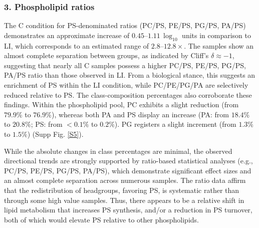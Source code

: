 \documentclass[10pt,letterpaper]{article}
\begin{document}
\begin{itemize}
\subsubsection*{3. Phospholipid ratios}
The C condition for PS-denominated ratios (PC/PS, PE/PS, PG/PS, PA/PS) demonstrates an approximate increase of $0.45$–$1.11 \,\log_{10}$ units in comparison to LI, which corresponds to an estimated range of $2.8$–$12.8\times$. The samples show an almost complete separation between groups, as indicated by Cliff’s $\delta \approx -1$, suggesting that nearly all C samples possess a higher PC/PS, PE/PS, PG/PS, PA/PS ratio than those observed in LI. From a biological stance, this suggests an enrichment of PS within the LI condition, 
while PC/PE/PG/PA are selectively reduced relative to PS. The class-composition percentages also corroborate these findings. Within the phospholipid pool, PC exhibits a slight reduction (from $79.9\%$ to $76.9\%$), whereas both PA and PS display an increase (PA: from $18.4\%$ to $20.8\%$; PS: from $<0.1\%$ to $0.2\%$). PG registers a slight increment (from $1.3\%$ to $1.5\%$) (Supp Fig. \ref{S5}). 

While the absolute changes in class percentages are minimal, the observed directional trends are strongly supported by ratio-based statistical analyses (e.g., PC/PS, PE/PS, PG/PS, PA/PS), which demonstrate significant effect sizes and an almost complete separation across numerous samples. The ratio data affirm that the redistribution of headgroups, favoring PS, is systematic rather than through some high value samples. Thus, there appears to be a relative shift in lipid metabolism that increases PS synthesis, and/or a reduction in PS turnover, both of which would elevate PS relative to other phospholipids. 


\end{itemize}
\end{document}
